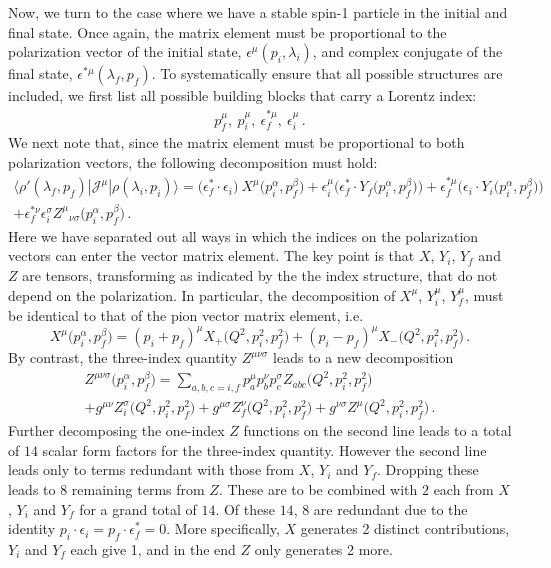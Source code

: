 Now, we turn to the case where we have a stable spin-1 particle in the initial and final state. Once again, the matrix element must be proportional to the polarization vector of the initial state, $\epsilon^{\mu}(p_i,\lambda_i)$, and complex conjugate of the final state, $\epsilon^{* \mu}(\lambda_f,p_f)$. {\mh To systematically ensure that all possible structures are included, we first list all possible building blocks that carry a Lorentz index:
\begin{gather}
p_f^\mu,\ p_i^\mu,\ \epsilon^{*\mu}_f,\ \epsilon_i^{\mu} \,.
\end{gather}
We next note that, since the matrix element must be proportional to both polarization vectors, the following decomposition must hold:
\begin{multline}
\langle\rho'(\lambda_f,p_f)|{\mathcal{J}}^{\mu}|\rho(\lambda_i,p_i)\rangle
=
\big ( \epsilon_f^*\cdot \epsilon_i \big ) \  {X}^\mu \big (p_i^\alpha,p_f^\beta \big)
+ \epsilon_i^\mu    \Big ( \epsilon_f^* \cdot {Y_f} \big (p_i^\alpha,p_f^\beta \big) \Big ) 
+ \epsilon_f^{*\mu}  \Big (  \epsilon_i \cdot {Y_i}  \big (p_i^\alpha,p_f^\beta \big)  \Big ) \\ 
+  \epsilon_f^{*\nu}   \epsilon_i^\sigma {Z^{\mu}}_{\nu \sigma}  \big (p_i^\alpha,p_f^\beta \big) \,.
\end{multline}
 Here we have separated out all ways in which the indices on the polarization vectors can enter the vector matrix element. The key point is that $X$, $Y_i$, $Y_f$ and $Z$ are tensors, transforming as indicated by the the index structure, that do not depend on the polarization. In particular, the decomposition of $X^\mu$, $Y_i^\mu$, $Y_f^\mu$, must be identical to that of the pion vector matrix element, i.e.
\begin{equation}
{X}^\mu \big (p_i^\alpha,p_f^\beta \big) = (p_i + p_f)^\mu X_+ \big (Q^2, p_i^2,p_f^2 \big) + (p_i - p_f)^\mu {X_-} \big (Q^2, p_i^2,p_f^2 \big) \,.
\end{equation}
By contrast, the three-index quantity $Z^{\mu \nu \sigma}$ leads to a new decomposition
\begin{multline}
Z^{\mu \nu \sigma} \big (p_i^\alpha,p_f^\beta \big) = \sum_{a,b,c=i,f} p_a^\mu p_b^\nu p_c^\sigma Z_{abc} \big (Q^2, p_i^2,p_f^2 \big) \\ 
+ g^{\mu \nu}  Z^\sigma_i \big (Q^2, p_i^2,p_f^2 \big) + g^{\mu \sigma}  Z^\nu_f \big (Q^2, p_i^2,p_f^2 \big) + g^{\nu \sigma}  Z^\mu \big (Q^2, p_i^2,p_f^2 \big) \,.
\end{multline}
Further decomposing the one-index $Z$ functions on the second line leads to a total of $14$ scalar form factors for the three-index quantity. However the second line leads only to terms redundant with those from $X$, $Y_i$ and $Y_f$. Dropping these leads to $8$ remaining terms from $Z$. These are to be combined with $2$ each from $X$, $Y_i$ and $Y_f$ for a grand total of $14$. Of these $14$, $8$ are redundant due to the identity $p_i\cdot \epsilon_i=p_f\cdot \epsilon_f^*=0$. More specifically, $X$ generates 2 distinct contributions, $Y_i$ and $Y_f$ each give 1, and in the end $Z$ only generates 2 more.}



